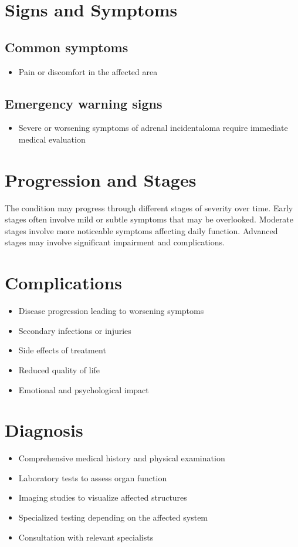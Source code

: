 \section{Signs and Symptoms}
\subsection{Common symptoms}
\begin{itemize}[noitemsep]
  \item Pain or discomfort in the affected area
  \end{itemize}
\subsection{Emergency warning signs}
\begin{itemize}[noitemsep]
  \item Severe or worsening symptoms of adrenal incidentaloma require immediate medical evaluation
\end{itemize}
\section{Progression and Stages}
The condition may progress through different stages of severity over time. Early stages often involve mild or subtle symptoms that may be overlooked. Moderate stages involve more noticeable symptoms affecting daily function. Advanced stages may involve significant impairment and complications.
\section{Complications}
\begin{itemize}[noitemsep]
  \item Disease progression leading to worsening symptoms
  \item Secondary infections or injuries
  \item Side effects of treatment
  \item Reduced quality of life
  \item Emotional and psychological impact
\end{itemize}
\section{Diagnosis}
\begin{itemize}[noitemsep]
  \item Comprehensive medical history and physical examination
  \item Laboratory tests to assess organ function
  \item Imaging studies to visualize affected structures
  \item Specialized testing depending on the affected system
  \item Consultation with relevant specialists
\end{itemize}
